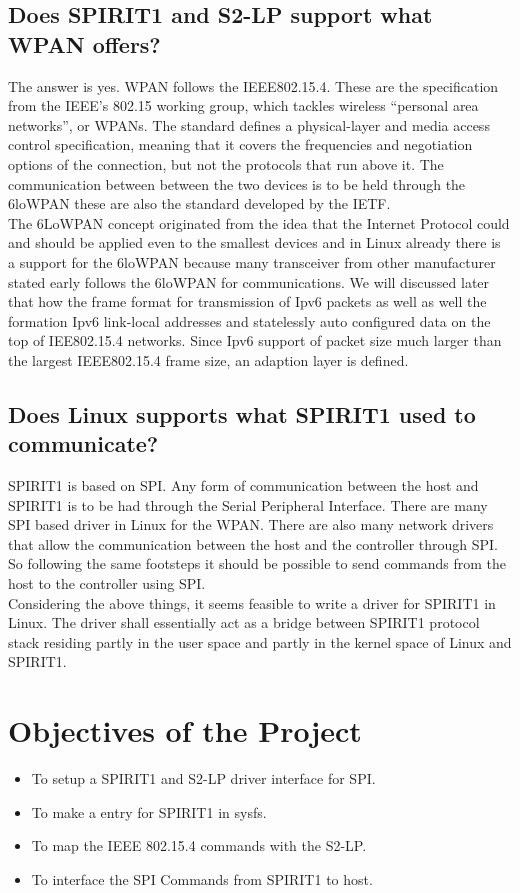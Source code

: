 \subsection{Does SPIRIT1 and S2-LP support what WPAN offers?}
The answer is yes. WPAN follows the IEEE802.15.4. These are the specification from the IEEE's 802.15 working group, which tackles wireless ``personal area networks'', or WPANs. The standard defines a physical-layer and media access control specification, meaning that it covers the frequencies and negotiation options of the connection, but not the protocols that run above it. The communication between between the two devices is to be held through the 6loWPAN these are also the standard developed by the IETF.\\
The 6LoWPAN concept originated from the idea that the Internet Protocol could and should be applied even to the smallest devices and in Linux already there is a support for the 6loWPAN because many transceiver from other manufacturer stated early follows the 6loWPAN for communications. We will discussed later that how the frame format for transmission of Ipv6 packets as well as well the formation Ipv6 link-local addresses and statelessly auto configured data on the top of IEE802.15.4 networks. Since Ipv6 support of packet size much larger than the largest IEEE802.15.4 frame size, an adaption layer is defined. 
\subsection{Does Linux supports what SPIRIT1 used to communicate?}
SPIRIT1 is based on SPI. Any form of communication between the host and SPIRIT1 is to be had through the Serial Peripheral Interface. There are many SPI based driver in Linux for the WPAN.   There are also many network drivers that allow the communication between the host and the controller through SPI. So following the same footsteps it should be possible to send commands from the host to the controller using SPI.\\
Considering the above things, it seems feasible to write a driver for SPIRIT1 in Linux. The driver shall essentially act as a bridge between SPIRIT1 protocol stack residing partly in the user space and partly in the kernel space of Linux and SPIRIT1.
\section{Objectives of the Project}
\begin{itemize}
	\item To setup a SPIRIT1 and S2-LP driver interface for SPI.
	\item To make a entry for SPIRIT1 in sysfs.
	\item To map the IEEE 802.15.4 commands with the S2-LP.
	\item To interface the SPI Commands from SPIRIT1 to host.
\end{itemize}
